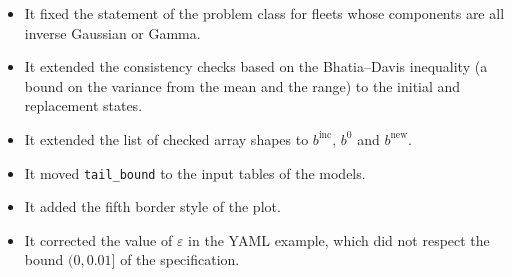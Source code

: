 \documentclass[11pt,a4paper]{article}
\theoremstyle{plain}
\theoremstyle{definition}
\theoremstyle{remark}
\begin{document}
\begin{itemize}
\begin{itemize}
      \item It fixed the statement of the problem class for fleets whose components are all inverse Gaussian or Gamma.
      \item It extended the consistency checks based on the Bhatia--Davis inequality (a bound on the variance from the mean and the range) to the initial and replacement states.
      \item It extended the list of checked array shapes to $b^{\mathrm{inc}}$, $b^{0}$ and $b^{\mathrm{new}}$.
      \item It moved \texttt{tail\_bound} to the input tables of the models.
      \item It added the fifth border style of the plot.
      \item It corrected the value of $\varepsilon$ in the YAML example, which did not respect the bound $(0, 0.01]$ of the specification.
    \end{itemize}
\end{itemize}
\end{document}
